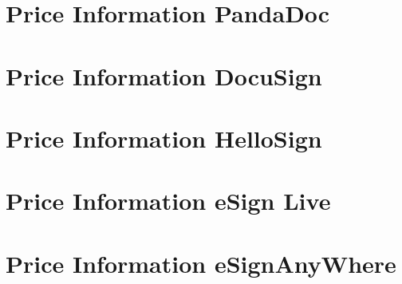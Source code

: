 \section{Price Information PandaDoc} \label{tool:sec:pandaPrice}


\section{Price Information DocuSign} \label{tool:sec:docusignPrice}


\section{Price Information HelloSign} \label{tool:sec:hellosignPrice}


\section{Price Information eSign Live} \label{tool:sec:esignlivePrice}


\section{Price Information eSignAnyWhere} \label{tool:sec:esignanyPrice}
